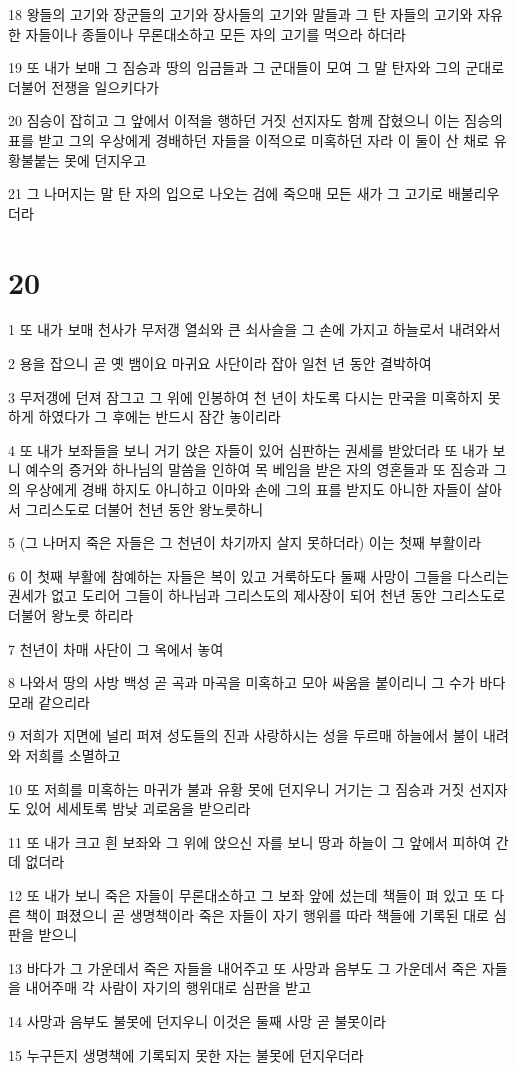 \par 18 왕들의 고기와 장군들의 고기와 장사들의 고기와 말들과 그 탄 자들의 고기와 자유한 자들이나 종들이나 무론대소하고 모든 자의 고기를 먹으라 하더라
\par 19 또 내가 보매 그 짐승과 땅의 임금들과 그 군대들이 모여 그 말 탄자와 그의 군대로 더불어 전쟁을 일으키다가
\par 20 짐승이 잡히고 그 앞에서 이적을 행하던 거짓 선지자도 함께 잡혔으니 이는 짐승의 표를 받고 그의 우상에게 경배하던 자들을 이적으로 미혹하던 자라 이 둘이 산 채로 유황불붙는 못에 던지우고
\par 21 그 나머지는 말 탄 자의 입으로 나오는 검에 죽으매 모든 새가 그 고기로 배불리우더라

\chapter{20}

\par 1 또 내가 보매 천사가 무저갱 열쇠와 큰 쇠사슬을 그 손에 가지고 하늘로서 내려와서
\par 2 용을 잡으니 곧 옛 뱀이요 마귀요 사단이라 잡아 일천 년 동안 결박하여
\par 3 무저갱에 던져 잠그고 그 위에 인봉하여 천 년이 차도록 다시는 만국을 미혹하지 못하게 하였다가 그 후에는 반드시 잠간 놓이리라
\par 4 또 내가 보좌들을 보니 거기 앉은 자들이 있어 심판하는 권세를 받았더라 또 내가 보니 예수의 증거와 하나님의 말씀을 인하여 목 베임을 받은 자의 영혼들과 또 짐승과 그의 우상에게 경배 하지도 아니하고 이마와 손에 그의 표를 받지도 아니한 자들이 살아서 그리스도로 더불어 천년 동안 왕노릇하니
\par 5 (그 나머지 죽은 자들은 그 천년이 차기까지 살지 못하더라) 이는 첫째 부활이라
\par 6 이 첫째 부활에 참예하는 자들은 복이 있고 거룩하도다 둘째 사망이 그들을 다스리는 권세가 없고 도리어 그들이 하나님과 그리스도의 제사장이 되어 천년 동안 그리스도로 더불어 왕노릇 하리라
\par 7 천년이 차매 사단이 그 옥에서 놓여
\par 8 나와서 땅의 사방 백성 곧 곡과 마곡을 미혹하고 모아 싸움을 붙이리니 그 수가 바다 모래 같으리라
\par 9 저희가 지면에 널리 퍼져 성도들의 진과 사랑하시는 성을 두르매 하늘에서 불이 내려와 저희를 소멸하고
\par 10 또 저희를 미혹하는 마귀가 불과 유황 못에 던지우니 거기는 그 짐승과 거짓 선지자도 있어 세세토록 밤낮 괴로움을 받으리라
\par 11 또 내가 크고 흰 보좌와 그 위에 앉으신 자를 보니 땅과 하늘이 그 앞에서 피하여 간데 없더라
\par 12 또 내가 보니 죽은 자들이 무론대소하고 그 보좌 앞에 섰는데 책들이 펴 있고 또 다른 책이 펴졌으니 곧 생명책이라 죽은 자들이 자기 행위를 따라 책들에 기록된 대로 심판을 받으니
\par 13 바다가 그 가운데서 죽은 자들을 내어주고 또 사망과 음부도 그 가운데서 죽은 자들을 내어주매 각 사람이 자기의 행위대로 심판을 받고
\par 14 사망과 음부도 불못에 던지우니 이것은 둘째 사망 곧 불못이라
\par 15 누구든지 생명책에 기록되지 못한 자는 불못에 던지우더라

